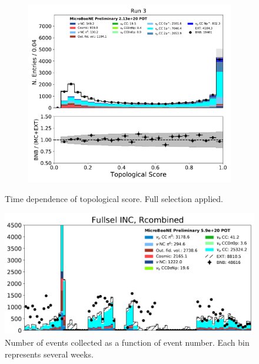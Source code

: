 \begin{figure}[hbt!]
\begin{center}
\begin{subfigure}[b]{0.35\textwidth}
    \end{subfigure}
    \begin{subfigure}[b]{0.35\textwidth}
        \centering
        \includegraphics[width=1.00\textwidth]{NuMuCCsel/Images/Ryan/Run3_nocrt/topological_score_08072020_fullsel_samples_longest_noCRT_event_category.pdf}
    \end{subfigure} %
\caption{Time dependence of topological score. Full selection applied.}
\label{fig:NuMuCCsel:timedep:topo_fullsel}
\end{center}
\end{figure}

\begin{figure}[hbt!]
    \centering
    \includegraphics[width=0.5\linewidth]{NuMuCCsel/Images/Ryan/other/RUN_SPECTRUM.PNG}
    \caption{Number of events collected as a function of event number. Each bin represents several weeks.}
    \label{fig:NuMuCCsel:timedep:RunsDistribution}
\end{figure}